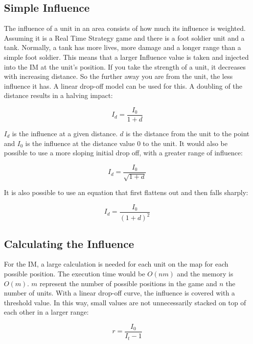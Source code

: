 \documentclass[]{report}
\begin{document}
	\subsection{Simple Influence} \label{ssec:num2}
	The influence of a unit in an area consists of how much its influence is weighted. Assuming it is a Real Time Strategy game and there is a foot soldier unit and a tank. Normally, a tank has more lives, more damage and a longer range than a simple foot soldier. This means that a larger Influence value is taken and injected into the \ac{IM} at the unit's position. If you take the strength of a unit, it decreases with increasing distance. So the further away you are from the unit, the less influence it has. A linear drop-off model can be used for this. A doubling of the distance results in a halving impact:
	
	\begin{equation}
		I_{d} = \frac{I_{0}}{1 + d}
	\end{equation}

	
	$I_{d}$ is the influence at a given distance. $d$ is the distance from the unit to the point and $I_{0}$ is the influence at the distance value 0 to the unit. It would also be possible to use a more sloping initial drop off, with a greater range of influence:
	
	\begin{equation}
		I_{d} = \frac{I_{0}}{\sqrt{1 + d}}
	\end{equation}
	
	It is also possible to use an equation that first flattens out and then falls sharply: 
	
	\begin{equation}
		I_{d} = \frac{I_{0}}{(1 + d)^2}
	\end{equation}
	
	\subsection{Calculating the Influence}
	For the \ac{IM}, a large calculation is needed for each unit on the map for each possible position. The execution time would be $O(nm)$ and the memory is $O(m)$. $m$ represent the number of possible positions in the game and $n$ the number of units. With a linear drop-off curve, the influence is covered with a threshold value. In this way, small values are not unnecessarily stacked on top of each other in a larger range:
	
	\begin{equation}
		r = \frac{I_0}{I_t - 1}
	\end{equation}
\end{document}
